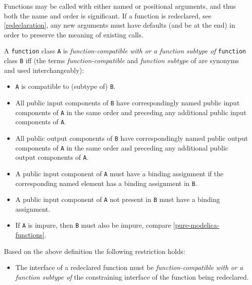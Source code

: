 \begin{nonnormative}
Functions may be called with either named or positional
arguments, and thus both the name and order is significant. If a
function is redeclared, see \cref{redeclaration}, any new arguments must
have defaults (and be at the end) in order to preserve the meaning of
existing calls.
\end{nonnormative}

\begin{definition}\label{function-compatibility}
A \lstinline!function! class \lstinline!A! is \emph{function-compatible with or a function subtype of} \lstinline!function! class \lstinline!B! iff (the terms \emph{function-compatible} and \emph{function subtype} of are synonyms and used interchangeably):
\begin{itemize}
\item
  \lstinline!A! is compatible to (subtype of) \lstinline!B!.
\item
  All public input components of \lstinline!B! have correspondingly named public
  input components of \lstinline!A! in the same order and preceding any additional
  public input components of \lstinline!A!.
\item
  All public output components of \lstinline!B! have correspondingly named public
  output components of \lstinline!A! in the same order and preceding any additional
  public output components of \lstinline!A!.
\item
  A public input component of \lstinline!A! must have a binding assignment if the
  corresponding named element has a binding assignment in \lstinline!B!.
\item
  A public input component of \lstinline!A! not present in \lstinline!B! must have a binding
  assignment.
\item
  If \lstinline!A! is impure, then \lstinline!B! must also be impure, compare \cref{pure-modelica-functions}.
\end{itemize}
\end{definition}

Based on the above definition the following restriction holds:
\begin{itemize}
\item
  The interface of a redeclared function must be
  \emph{function-compatible with or a function subtype of} the
  constraining interface of the function being redeclared.
\end{itemize}

